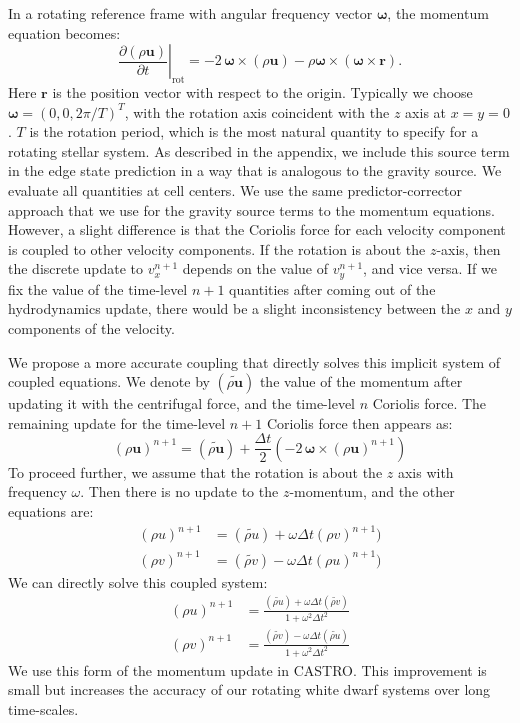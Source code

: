 \documentclass[iop]{emulateapj}
\begin{document}
In a rotating reference frame with angular frequency vector $\bm{\omega}$, the momentum equation becomes:
\begin{equation}
  \left.\frac{\partial(\rho \mathbf{u})}{\partial t}\right|_{\text{rot}} = -2\, {\bm\omega} \times (\rho\mathbf{u}) - \rho {\bm\omega} \times \left({\bm\omega} \times \mathbf{r}\right).
\end{equation}
Here $\mathbf{r}$ is the position vector with respect to the origin. Typically we choose $\bm{\omega} = (0, 0, 2\pi / T)^T$,
with the rotation axis coincident with the $z$ axis at $x = y = 0$.
$T$ is the rotation period, which is the most natural quantity to specify
for a rotating stellar system. As described in the appendix, we include this source term
in the edge state prediction in a way that is analogous to the gravity source.
We evaluate all quantities at cell centers. We use the same predictor-corrector 
approach that we use for the gravity source terms to the momentum equations. However, a slight 
difference is that the Coriolis force for each velocity component is coupled to other velocity 
components. If the rotation is about the $z$-axis, then the discrete update to 
$v_x^{n+1}$ depends on the value of $v_y^{n+1}$, and vice versa. If we fix the value of 
the time-level $n+1$ quantities after coming out of the hydrodynamics update, there 
would be a slight inconsistency between the $x$ and $y$ components of the velocity. 

We propose a more accurate coupling that directly solves this implicit system of coupled 
equations. We denote by $(\widetilde{\rho \mathbf{u}})$ the value of the momentum after 
updating it with the centrifugal force, and the time-level $n$ Coriolis force. The remaining 
update for the time-level $n+1$ Coriolis force then appears as:
\begin{equation}
  (\rho \mathbf{u})^{n+1} = (\widetilde{\rho\mathbf{u}}) + \frac{\Delta t}{2} \left(-2\, {\bm\omega} \times (\rho\mathbf{u})^{n+1}\right)
\end{equation}
To proceed further, we assume that the rotation is about the $z$ axis with frequency $\omega$. 
Then there is no update to the $z$-momentum, and the other equations are:
\begin{align}
  (\rho u)^{n+1} &= (\widetilde{\rho u}) + \omega \Delta t (\rho v)^{n+1}) \\
  (\rho v)^{n+1} &= (\widetilde{\rho v}) - \omega \Delta t (\rho u)^{n+1})
\end{align}
We can directly solve this coupled system:
\begin{align}
  (\rho u)^{n+1} &= \frac{ (\widetilde{\rho u}) + \omega \Delta t (\widetilde{\rho v})}{1 + \omega^2 \Delta t^2} \\
  (\rho v)^{n+1} &= \frac{ (\widetilde{\rho v}) - \omega \Delta t (\widetilde{\rho u})}{1 + \omega^2 \Delta t^2}
\end{align}
We use this form of the momentum update in CASTRO. This improvement is small
but increases the accuracy of our rotating white dwarf systems over long time-scales.
\end{document}
